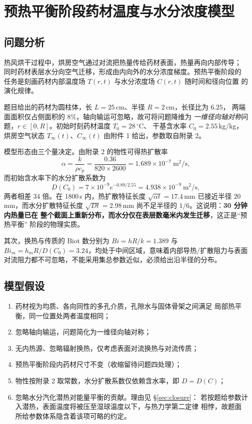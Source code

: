 \documentclass[12pt,a4paper]{ctexart}
\begin{document}
\section{预热平衡阶段药材温度与水分浓度模型}

\subsection{问题分析}

热风烘干过程中，烘房空气通过对流把热量传给药材表面，热量再向内部传导；
同时药材表层水分向空气迁移，形成由内向外的水分浓度梯度。预热平衡阶段的
任务是刻画药材内部温度场 $T(r,t)$ 与水分浓度场 $C(r,t)$ 随时间和径向位置
的演化规律。

题目给出的药材为圆柱体，长 $L=25$\,cm、半径 $R=2$\,cm，长径比为 $6.25$，
两端面面积仅占侧面积的 $8\%$，轴向输运可忽略，故可将问题降维为
\emph{一维径向轴对称}问题，$r\in[0,R]$。初始时刻药材温度 $T_0=28\,^\circ$C、
干基含水率 $C_0=2.55$\,kg/kg，烘房空气状态 $T_\infty(t)$、$C_\infty(t)$
由附件 1 给出，参数取自附录 2。

模型形态由三个量决定。由附录 2 的物性可得热扩散率
\[
  \alpha=\frac{k}{\rho c_p}=\frac{0.36}{820\times2600}
  =1.689\times10^{-7}\ \mathrm{m^2/s},
\]
而初始含水率下的水分扩散系数为
\[
  D(C_0)=7\times10^{-9}e^{-0.89/2.55}=4.938\times10^{-9}\ \mathrm{m^2/s},
\]
两者相差 $34$ 倍。在 $1800$\,s 内，热扩散特征长度
$\sqrt{\alpha t}=17.4$\,mm 已接近半径 $20$\,mm，而水分扩散特征长度
$\sqrt{Dt}=2.98$\,mm 尚不足半径的 $1/6$。这说明：\textbf{30 分钟内热量已在
整个截面上重新分布，而水分仅在表层数毫米内发生迁移}，这正是``预热平衡''
阶段的物理实质。

其次，换热与传质的 Biot 数分别为 $Bi=hR/k=1.389$ 与
$Bi_m=h_mR/D(C_0)=3.24$，均处于中间区域，意味着内部导热/扩散阻力与表面
对流阻力都不可忽略，不能采用集总参数近似，必须给出沿半径的分布。

\subsection{模型假设}

\begin{enumerate}
  \item[(A1)] 药材视为均质、各向同性的多孔介质，孔隙水与固体骨架之间满足
        局部热平衡，同一位置处两者温度相同；
  \item[(A2)] 忽略轴向输运，问题简化为一维径向轴对称；
  \item[(A3)] 无内热源、忽略辐射换热，仅考虑表面对流换热与对流传质；
  \item[(A4)] 预热平衡阶段内药材尺寸不变（收缩留待问题四处理）；
  \item[(A5)] 物性按附录 2 取常数，水分扩散系数仅依赖含水率，即 $D=D(C)$；
  \item[(A6)] 忽略水分汽化潜热对能量平衡的贡献。理由见 §\ref{sec:closure}：
        若按题给参数计入潜热，表面温度将被压至湿球温度以下，与热力学第二定律
        相悖，故题面所给参数体系隐含着该项可略的约定。
\end{enumerate}
\end{document}
